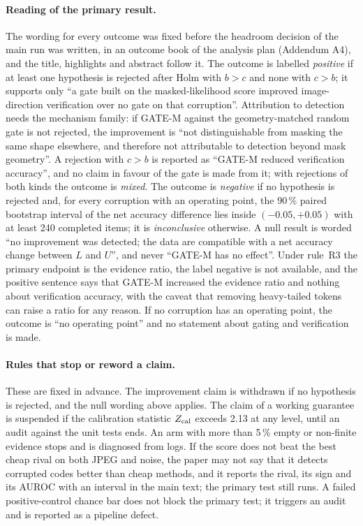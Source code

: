 \paragraph{Reading of the primary result.}
The wording for every outcome was fixed before the headroom decision of the main run was written, in an outcome book of the analysis
plan (Addendum A4), and the title, highlights and abstract follow it.
The outcome is labelled \emph{positive} if at least one hypothesis is rejected after Holm with $b>c$ and none with $c>b$; it supports
only ``a gate built on the masked-likelihood score improved image-direction verification over no gate on that corruption''.
Attribution to detection needs the mechanism family: if GATE-M against the geometry-matched random gate is not rejected, the
improvement is ``not distinguishable from masking the same shape elsewhere, and therefore not attributable to detection beyond mask
geometry''.
A rejection with $c>b$ is reported as ``GATE-M reduced verification accuracy'', and no claim in favour of the gate is made from it;
with rejections of both kinds the outcome is \emph{mixed}.
The outcome is \emph{negative} if no hypothesis is rejected and, for every corruption with an operating point, the 90\,\% paired
bootstrap interval of the net accuracy difference lies inside $(-0.05,+0.05)$ with at least 240 completed items; it is
\emph{inconclusive} otherwise.
A null result is worded ``no improvement was detected; the data are compatible with a net accuracy change between $L$ and $U$'', and
never ``GATE-M has no effect''.
Under rule~R3 the primary endpoint is the evidence ratio, the label negative is not available, and the positive sentence says that
GATE-M increased the evidence ratio and nothing about verification accuracy, with the caveat that removing heavy-tailed tokens can
raise a ratio for any reason.
If no corruption has an operating point, the outcome is ``no operating point'' and no statement about gating and verification is made.

\paragraph{Rules that stop or reword a claim.}
These are fixed in advance.
The improvement claim is withdrawn if no hypothesis is rejected, and the null wording above applies.
The claim of a working guarantee is suspended if the calibration statistic $Z_{\rm cal}$ exceeds 2.13 at any level, until an audit
against the unit tests ends.
An arm with more than 5\,\% empty or non-finite evidence stops and is diagnosed from logs.
If the score does not beat the best cheap rival on both JPEG and noise, the paper may not say that it detects corrupted codes better
than cheap methods, and it reports the rival, its sign and its AUROC with an interval in the main text; the primary test still runs.
A failed positive-control chance bar does not block the primary test; it triggers an audit and is reported as a pipeline defect.

